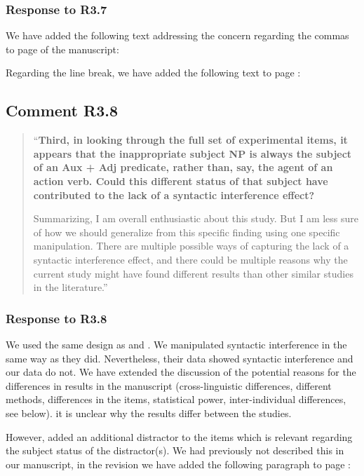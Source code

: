 \documentclass[12pt]{article}
\begin{document}
\subsubsection*{Response to R3.7}
We have added the following text addressing the concern regarding the commas to page \pageref{comma} of the manuscript:

\begin{quote}
\end{quote}

\noindent Regarding the line break, we have added the following text to page \pageref{linebreak}:

\begin{quote}
\end{quote}

\subsection*{Comment R3.8}
\begin{quote}
``\textbf{Third, in looking through the full set of experimental items, it appears that the inappropriate subject NP is always the subject of an Aux + Adj predicate, rather than, say, the agent of an action verb. Could this different status of that subject have contributed to the lack of a syntactic interference effect?}

Summarizing, I am overall enthusiastic about this study. But I am less sure of how we should generalize from this specific finding using one specific manipulation. There are multiple possible ways of capturing the lack of a syntactic interference effect, and there could be multiple reasons why the current study might have found different results than other similar studies in the literature.''
\end{quote}

\subsubsection*{Response to R3.8}
We used the same design as \textcite{vandyke07} and \textcite{mertzen}. We manipulated syntactic interference in the same way as they did. Nevertheless, their data showed syntactic interference and our data do not. We have extended the discussion of the potential reasons for the differences in results in the manuscript (cross-linguistic differences, different methods, differences in the items, statistical power, inter-individual differences, see below).  it is unclear why the results differ between the studies. 

However, \textcite{mertzen} added an additional distractor to the items which is relevant regarding the subject status of the distractor(s). We had previously not described this in our manuscript, in the revision we have added the following paragraph to page \pageref{items_mertzen}:

\setcounter{exx}{4}
\begin{quote}
\end{quote}
\end{document}
